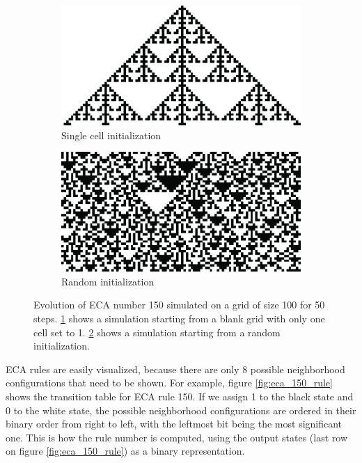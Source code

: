 \begin{figure}[htbp]
  \centering
\begin{subfigure}[b]{.45\linewidth}
  \centering
  \includegraphics[width=\linewidth]{figures/eca_150_single.pdf}
  \caption{Single cell initialization}
  \label{fig:eca_150_single}
\end{subfigure}
\begin{subfigure}[b]{.45\linewidth}
  \centering
  \includegraphics[width=\linewidth]{figures/eca_150_random.pdf}
  \caption{Random initialization}
  \label{fig:eca_150_random}
\end{subfigure}
\caption{Evolution of \ac{ECA} number 150 simulated on a grid of size 100 for 50
  steps. \ref{fig:eca_150_single} shows a simulation starting from a blank grid
  with only one cell set to 1. \ref{fig:eca_150_random} shows a simulation
  starting from a random initialization.}
  \label{fig:eca_150}
\end{figure}


\ac{ECA} rules are easily visualized, because there are only 8 possible
neighborhood configurations that need to be shown. For example, figure
\ref{fig:eca_150_rule} shows the transition table for \ac{ECA} rule 150. If we
assign 1 to the black state and 0 to the white state, the possible neighborhood
configurations are ordered in their binary order from right to left, with the
leftmost bit being the most significant one. This is how the rule number is
computed, using the output states (last row on figure \ref{fig:eca_150_rule}) as
a binary representation.

